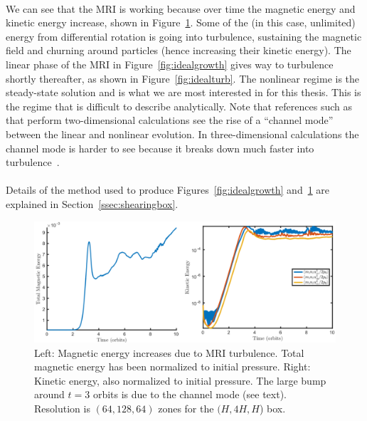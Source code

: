 \\
We can see that the MRI is working because over time the magnetic energy and kinetic energy increase, shown in Figure~\ref{fig:idealME}. Some of the (in this case, unlimited) energy from differential rotation is going into turbulence, sustaining the magnetic field and churning around particles (hence increasing their kinetic energy). The linear phase of the MRI in Figure~\ref{fig:idealgrowth} gives way to turbulence shortly thereafter, as shown in Figure~\ref{fig:idealturb}. The nonlinear regime is the steady-state solution and is what we are most interested in for this thesis. This is the regime that is difficult to describe analytically. Note that references such as~\citet{BH1991a} that perform two-dimensional calculations see the rise of a ``channel mode'' between the linear and nonlinear evolution. In three-dimensional calculations the channel mode is harder to see because it breaks down much faster into turbulence~\cite{HGB1995,HGB1996}.\\
\\
Details of the method used to produce Figures~\ref{fig:idealgrowth} and~\ref{fig:idealME} are explained in Section~\ref{ssec:shearingbox}.
\begin{figure}[h]
    \begin{center}
      \includegraphics [width=.9\textwidth, angle=0.]{img/ideal-R1L1_KEME.pdf}
    \end{center}
    \caption{Left: Magnetic energy increases due to MRI turbulence. Total magnetic energy has been normalized to initial pressure. Right: Kinetic energy, also normalized to initial pressure. The large bump around $t=3$ orbits is due to the channel mode (see text). Resolution is $(64,128,64)$ zones for the $(H,4H,H$) box.}
      \label{fig:idealME}
\end{figure}

